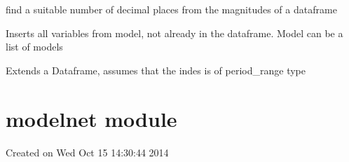 \documentclass[letterpaper,10pt,english]{sphinxmanual}
\begin{document}

\begin{fulllineitems}
\label{\detokenize{unsorted/modelhelp:modelhelp.finddec}}
\pysigstartsignatures
{}
\pysigstopsignatures
\sphinxAtStartPar
find a suitable number of decimal places from the magnitudes of a dataframe

\end{fulllineitems}


\begin{fulllineitems}
\label{\detokenize{unsorted/modelhelp:modelhelp.insertModelVar}}
\pysigstartsignatures
{}
\pysigstopsignatures
\sphinxAtStartPar
Inserts all variables from model, not already in the dataframe.
Model can be a list of models

\end{fulllineitems}


\begin{fulllineitems}
\label{\detokenize{unsorted/modelhelp:modelhelp.df_extend}}
\pysigstartsignatures
{}
\pysigstopsignatures
\sphinxAtStartPar
Extends a Dataframe, assumes that the indes is of period\_range type

\end{fulllineitems}


\sphinxstepscope


\section{modelnet module}
\label{\detokenize{unsorted/modelnet:module-modelnet}}\label{\detokenize{unsorted/modelnet:modelnet-module}}\label{\detokenize{unsorted/modelnet::doc}}
\sphinxAtStartPar
Created on Wed Oct 15 14:30:44 2014
\end{document}
